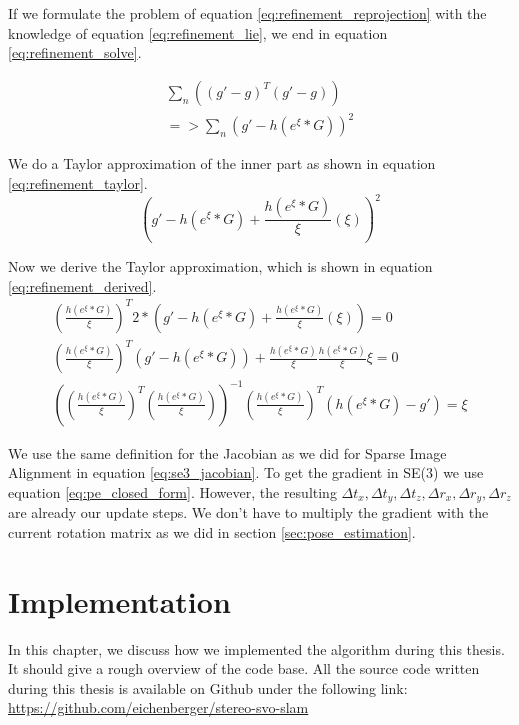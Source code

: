 \documentclass[11pt,a4paper,titlepage,oneside]{report}
\begin{document}
If we formulate the problem of equation \ref{eq:refinement_reprojection} with the knowledge of equation \ref{eq:refinement_lie}, we end in equation \ref{eq:refinement_solve}.

\begin{equation}\label{eq:refinement_solve}
  \begin{gathered}
    \sum_n ((g'-g)^T(g'-g))\\
    =>\sum_n (g'-h(e^{\xi}*G))^2
  \end{gathered}
\end{equation}

We do a Taylor approximation of the inner part as shown in equation \ref{eq:refinement_taylor}.
\begin{equation}\label{eq:refinement_taylor}
  (g'-h(e^{\xi}*G)+\frac{h(e^{\xi}*G)}{\xi}(\xi))^2
\end{equation}

Now we derive the Taylor approximation, which is shown in equation \ref{eq:refinement_derived}.
\begin{equation}\label{eq:refinement_derived}
  \begin{gathered}
    (\frac{h(e^{\xi}*G)}{\xi})^T2*(g'-h(e^{\xi}*G)+\frac{h(e^{\xi}*G)}{\xi}(\xi))=0\\
    (\frac{h(e^{\xi}*G)}{\xi})^T(g'-h(e^{\xi}*G))+\frac{h(e^{\xi}*G)}{\xi}\frac{h(e^{\xi}*G)}{\xi}\xi=0\\
    ((\frac{h(e^{\xi}*G)}{\xi})^T(\frac{h(e^{\xi}*G)}{\xi}))^{-1}(\frac{h(e^{\xi}*G)}{\xi})^T(h(e^{\xi}*G)-g')=\xi
  \end{gathered}
\end{equation}

We use the same definition for the Jacobian as we did for Sparse Image Alignment in equation \ref{eq:se3_jacobian}. To get the gradient in SE(3) we use equation \ref{eq:pe_closed_form}. However, the resulting $\Delta t_x,\Delta t_y,\Delta t_z,\Delta r_x,\Delta r_y,\Delta r_z$ are already our update steps. We don't have to multiply the gradient with the current rotation matrix as we did in section \ref{sec:pose_estimation}.

\chapter{Implementation}\label{ch:implementation}
In this chapter, we discuss how we implemented the algorithm during this thesis. It should give a rough overview of the code base. All the source code written during this thesis is available on Github under the following link:\\
\url{https://github.com/eichenberger/stereo-svo-slam}
\end{document}
